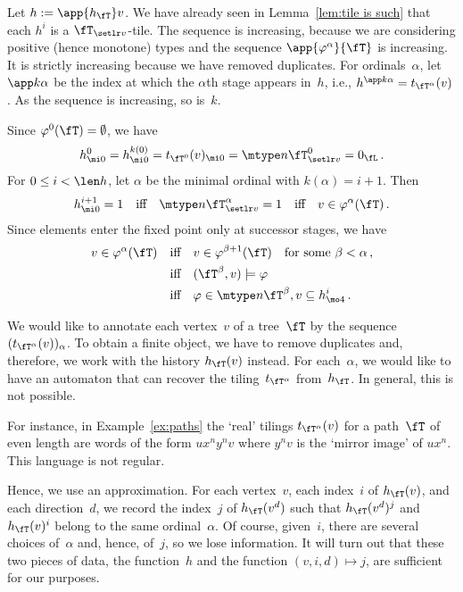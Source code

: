 \documentclass{LMCS}
\begin{document}
\proof
Let $h := \app{h_{\fT}}v$.
We have already seen in Lemma~\ref{lem:tile is such}
that each $h^i$ is a $\fT_{\setlr v}$-tile.
The sequence is increasing,
because we are considering positive (hence monotone) types
and the sequence $\app{\varphi^{\alpha}}{\fT}$ is increasing.
It is strictly increasing because we have removed duplicates.
For ordinals~$\alpha$, let $\app k{\alpha}$ be the index
at which the $\alpha$th stage appears in~$h$, i.e.,
$h^{\app k{\alpha}} = t_{\fT^{\alpha}}(v)$.
As the sequence is increasing, so is~$k$.

Since $\varphi^0(\fT) = \emptyset$, we have
\begin{align*}
  h^0_{\mi0}
  = h^{k(0)}_{\mi0}
  = t_{\fT^0}(v)_{\mi0}
  = \mtype n{\fT^0_{\setlr v}}
  = 0_{\fL}\,.
\end{align*}
For $0\leq i<\len h$, let $\alpha$ be the minimal ordinal with $k(\alpha) = i+1$.
Then
\begin{align*}
  h^{i+1}_{\mi0}=1
  \quad\text{iff}\quad \mtype n{\fT^\alpha_{\setlr v}}=1
  \quad\text{iff}\quad v\in \varphi^\alpha(\fT)\,.
\end{align*}
Since elements enter the fixed point only at successor stages, we have
\begin{align*}
  v\in \varphi^\alpha(\fT)
  &\quad\text{iff}\quad v \in \varphi^{\beta+1}(\fT) \quad\text{for some } \beta < \alpha\,, \\
  &\quad\text{iff}\quad (\fT^\beta,v) \models \varphi \\
  &\quad\text{iff}\quad \varphi\in\mtype n{\fT^\beta,v} \subseteq
  h^i_{\mo4}\,.\rlap{\hbox to 144 pt{\hfill\qEd}}
\end{align*}

\noindent We would like to annotate each vertex~$v$ of a tree~$\fT$ by the sequence
$(t_{\fT^\alpha}(v))_\alpha$. To obtain a finite object, we have to remove
duplicates and, therefore, we work with the history $h_\fT(v)$ instead.
For each~$\alpha$, we would like to have an automaton that can recover the
tiling~$t_{\fT^\alpha}$ from~$h_\fT$.
In general, this is not possible.

For instance, in Example~\ref{ex:paths} the `real' tilings $t_{\fT^\alpha}(v)$
for a path~$\fT$ of even length are words of the form $ux^ny^nv$
where $y^nv$ is the `mirror image' of $ux^n$.
This language is not regular.

Hence, we use an approximation.
For each vertex~$v$, each index~$i$ of $h_\fT(v)$, and each direction~$d$,
we record the index~$j$ of $h_\fT(v^d)$ such that
$h_\fT(v^d)^j$ and $h_\fT(v)^i$ belong to the same ordinal~$\alpha$.
Of course, given~$i$, there are several choices of~$\alpha$
and, hence, of~$j$, so we lose information. It will turn out that
these two pieces of data,
the function~$h$ and the function $(v,i,d) \mapsto j$,
are sufficient for our purposes.
\end{document}
